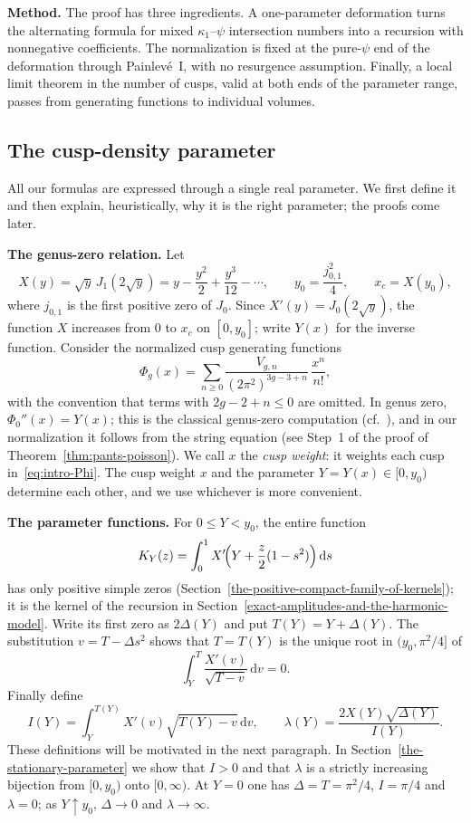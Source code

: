 \textbf{Method.} The proof has three ingredients. A one-parameter deformation turns the alternating formula for mixed $\kappa_1$--$\psi$ intersection numbers into a recursion with nonnegative coefficients. The normalization is fixed at the pure-$\psi$ end of the deformation through Painlev\'e~I, with no resurgence assumption. Finally, a local limit theorem in the number of cusps, valid at both ends of the parameter range, passes from generating functions to individual volumes.

\subsection{The cusp-density parameter}\label{subsec:parameter}
All our formulas are expressed through a single real parameter. We first define it and then explain, heuristically, why it is the right parameter; the proofs come later.

\textbf{The genus-zero relation.} Let
\[
 X(y)=\sqrt y\,J_1(2\sqrt y)=y-\frac{y^2}{2}+\frac{y^3}{12}-\cdots,
 \qquad y_0=\frac{j_{0,1}^2}{4},\qquad x_c=X(y_0),
\]
where $j_{0,1}$ is the first positive zero of $J_0$. Since $X'(y)=J_0(2\sqrt y)$, the function $X$ increases from $0$ to $x_c$ on $[0,y_0]$; write $Y(x)$ for the inverse function. Consider the normalized cusp generating functions
\begin{equation}
 \Phi_g(x)=\sum_{n\ge0}\frac{V_{g,n}}{(2\pi^2)^{3g-3+n}}\,\frac{x^n}{n!},
 \label{eq:intro-Phi}
\end{equation}
with the convention that terms with $2g-2+n\le0$ are omitted. In genus zero, $\Phi_0''(x)=Y(x)$; this is the classical genus-zero computation (cf.~\cite{KMZ,ManZ}), and in our normalization it follows from the string equation (see Step~1 of the proof of Theorem~\ref{thm:pants-poisson}). We call $x$ the \emph{cusp weight}: it weights each cusp in~\eqref{eq:intro-Phi}. The cusp weight $x$ and the parameter $Y=Y(x)\in[0,y_0)$ determine each other, and we use whichever is more convenient.

\textbf{The parameter functions.} For $0\le Y<y_0$, the entire function
\[
 K_Y(z)=\int_0^1X'\!\Bigl(Y+\frac z2(1-s^2)\Bigr)\,\mathrm ds
\]
has only positive simple zeros (Section~\ref{the-positive-compact-family-of-kernels}); it is the kernel of the recursion in Section~\ref{exact-amplitudes-and-the-harmonic-model}. Write its first zero as $2\Delta(Y)$ and put $T(Y)=Y+\Delta(Y)$. The substitution $v=T-\Delta s^2$ shows that $T=T(Y)$ is the unique root in $(y_0,\pi^2/4]$ of
\begin{equation}
 \int_Y^T\frac{X'(v)}{\sqrt{T-v}}\,\mathrm{d}v=0.
 \label{eq:SP1}
\end{equation}
Finally define
\begin{equation}
 I(Y)=\int_Y^{T(Y)} X'(v)\sqrt{T(Y)-v}\,\mathrm{d}v,
 \qquad
 \lambda(Y)=\frac{2X(Y)\sqrt{\Delta(Y)}}{I(Y)}.
 \label{eq:SP2}
\end{equation}
These definitions will be motivated in the next paragraph. In Section~\ref{the-stationary-parameter} we show that $I>0$ and that $\lambda$ is a strictly increasing bijection from $[0,y_0)$ onto $[0,\infty)$. At $Y=0$ one has $\Delta=T=\pi^2/4$, $I=\pi/4$ and $\lambda=0$; as $Y\uparrow y_0$, $\Delta\to0$ and $\lambda\to\infty$.


